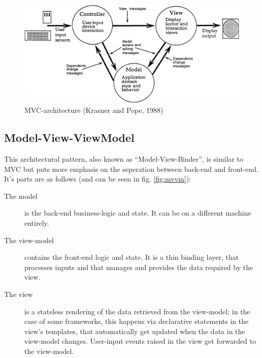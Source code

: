 \begin{figure}
\centering
\includegraphics[width=1.0\textwidth]{figures/mvc.png}
\caption[MVC-architecture]{MVC-architecture (Krasner and Pope, 1988)}
\label{fig:mvc}
\end{figure}

\subsection{Model-View-ViewModel}

This architectural pattern, also known as ``Model-View-Binder'', is similar to MVC but puts more emphasis on the seperation between back-end and front-end. It's parts are as follows (and can be seen in fig. \ref{fig:mvvm}):

\begin{description}
  \item[The model] is the back-end business-logic and state. It can be on a different machine entirely.
  \item[The view-model] contains the front-end logic and state. It is a thin binding layer, that processes inputs and that manages and provides the data required by the view.
  \item[The view] is a stateless rendering of the data retrieved from the view-model; in the case of some frameworks, this happens via declarative statements in the view's templates, that automatically get updated when the data in the view-model changes. User-input events raised in the view get forwarded to the view-model.
\end{description}

